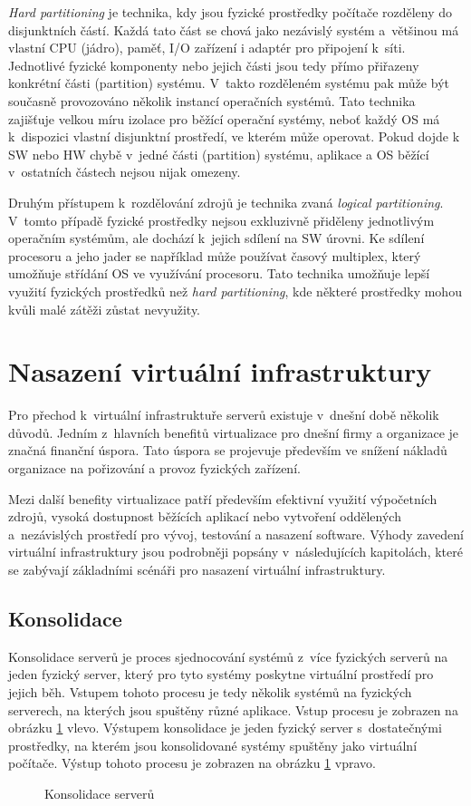 \textit{Hard partitioning} je technika, kdy jsou fyzické prostředky počítače rozděleny do disjunktních částí. Každá tato část
se chová jako nezávislý systém a~většinou má vlastní CPU (jádro), paměť, I/O zařízení i adaptér pro připojení k~síti. Jednotlivé
fyzické komponenty nebo jejich části jsou tedy přímo přiřazeny konkrétní části (partition) systému. V~takto rozděleném systému
pak může být současně provozováno několik instancí operačních systémů. Tato technika zajišťuje velkou míru izolace pro běžící operační
systémy, neboť každý OS má k~dispozici vlastní disjunktní prostředí, ve kterém může operovat. Pokud dojde k SW nebo HW chybě
v~jedné části (partition) systému, aplikace a OS běžící v~ostatních částech nejsou nijak omezeny.

Druhým přístupem k~rozdělování zdrojů je technika zvaná \textit{logical partitioning}. V~tomto případě fyzické prostředky nejsou
exkluzivně přiděleny jednotlivým operačním systémům, ale dochází k~jejich sdílení na SW úrovni. Ke sdílení procesoru a jeho jader
se například může používat časový multiplex, který umožňuje střídání OS ve využívání procesoru. Tato technika umožňuje lepší
využití fyzických prostředků než \textit{hard partitioning}, kde některé prostředky mohou kvůli malé zátěži zůstat nevyužity.
\section{Nasazení virtuální infrastruktury}
\label{chapter:virtualization:deployment}
Pro přechod k~virtuální infrastruktuře serverů existuje v~dnešní době několik důvodů. Jedním z~hlavních benefitů virtualizace
pro dnešní firmy a organizace je značná finanční úspora. Tato úspora se projevuje především ve snížení nákladů organizace na
pořizování a provoz fyzických zařízení. 

Mezi další benefity virtualizace patří především efektivní využití výpočetních zdrojů, vysoká dostupnost běžících aplikací nebo
vytvoření oddělených a~nezávislých prostředí pro vývoj, testování a nasazení software. Výhody zavedení virtuální infrastruktury
jsou podrobněji popsány v~následujících kapitolách, které se zabývají základními scénáři pro nasazení virtuální infrastruktury.
\subsection{Konsolidace}
\label{chapter:virtualization:deployment:consolidation}
Konsolidace serverů je proces sjednocování systémů z~více fyzických serverů na jeden fyzický server, který pro tyto systémy
poskytne virtuální prostředí pro jejich běh. Vstupem tohoto procesu je tedy několik systémů na fyzických serverech, na kterých
jsou spuštěny různé aplikace. Vstup procesu je zobrazen na obrázku \ref{figure:consolidation_img} vlevo. Výstupem konsolidace
je jeden fyzický server s~dostatečnými prostředky, na kterém jsou konsolidované systémy spuštěny jako virtuální počítače.
Výstup tohoto procesu je zobrazen na obrázku \ref{figure:consolidation_img} vpravo.
\begin{figure}
    \centering    
    \caption{Konsolidace serverů}
    \label{figure:consolidation_img}
\end{figure}
